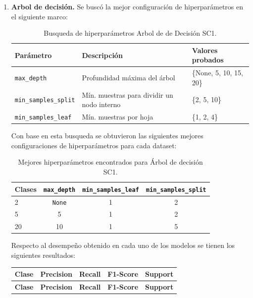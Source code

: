 \documentclass[12pt,a4paper]{article}
\begin{document}
\begin{enumerate}
  \item \textbf{Arbol de decisión.}
  Se buscó la mejor configuración de hiperparámetros en el siguiente marco:
  \begin{table}[htbp]
    \centering
    \begin{tabular}{@{}lll@{}}
      \toprule
      \textbf{Parámetro} & \textbf{Descripción} & \textbf{Valores probados} \\
      \midrule
      \texttt{max\_depth} & Profundidad máxima del árbol & \{None, 5, 10, 15, 20\} \\
      \texttt{min\_samples\_split} & Mín. muestras para dividir un nodo interno & \{2, 5, 10\} \\
      \texttt{min\_samples\_leaf} & Mín. muestras por hoja & \{1, 2, 4\} \\
      \bottomrule
    \end{tabular}
    \caption{Busqueda de hiperparámetros Arbol de de Decisión SC1.}
    \label{tab:param_dt_sc1}
  \end{table}

  Con base en esta busqueda se obtuvieron las siguientes mejores configuraciones de hiperparámetros para cada dataset:

  \begin{table}[htbp]
    \centering
    \begin{tabular}{@{}lccc@{}}
      \toprule
      \textbf{Clases} & \texttt{max\_depth} & \texttt{min\_samples\_leaf} & \texttt{min\_samples\_split} \\
      \midrule
      2  & \texttt{None} & 1 & 2 \\
      5  & 5              & 1 & 2 \\
      20 & 10             & 1 & 5 \\
      \bottomrule
    \end{tabular}
    \caption{Mejores hiperparámetros encontrados para Árbol de decisión SC1.}
    \label{tab:best_hparams_dt_sc1}
  \end{table}

  Respecto al desempeño obtenido en cada uno de los modelos se tienen los siguientes resultados:

  \small
  \setlength{\tabcolsep}{4pt}
  \begin{longtable}{@{}lcccc@{}}
    \toprule
    \textbf{Clase} & \textbf{Precision} & \textbf{Recall} & \textbf{F1-Score} & \textbf{Support} \\
    \midrule
    \endfirsthead

    \toprule
    \textbf{Clase} & \textbf{Precision} & \textbf{Recall} & \textbf{F1-Score} & \textbf{Support} \\
    \midrule
    \endhead


\end{longtable}
\end{enumerate}
\end{document}
